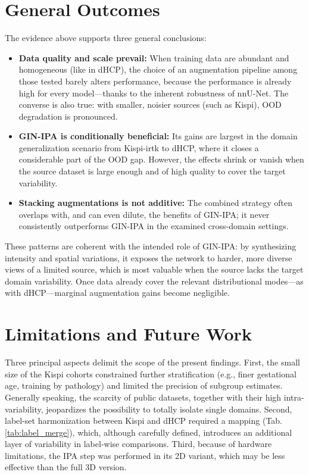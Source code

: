 \section{General Outcomes}
The evidence above supports three general conclusions:
\begin{itemize}
    \item \textbf{Data quality and scale prevail:} When training data are abundant and homogeneous (like in dHCP), the choice of an augmentation pipeline among those tested barely alters performance, because the performance is already high for every model---thanks to the inherent robustness of nnU-Net. The converse is also true: with smaller, noisier sources (such as Kispi), OOD degradation is pronounced.
    \item \textbf{GIN-IPA is conditionally beneficial:} Its gains are largest in the domain generalization scenario from Kispi-irtk to dHCP, where it closes a considerable part of the OOD gap. However, the effects shrink or vanish when the source dataset is large enough and of high quality to cover the target variability.
    \item \textbf{Stacking augmentations is not additive:} The combined strategy often overlaps with, and can even dilute, the benefits of GIN-IPA; it never consistently outperforms GIN-IPA in the examined cross-domain settings.
\end{itemize}

These patterns are coherent with the intended role of GIN-IPA: by synthesizing intensity and spatial variations, it exposes the network to harder, more diverse views of a limited source, which is most valuable when the source lacks the target domain variability. Once data already cover the relevant distributional modes---as with dHCP---marginal augmentation gains become negligible.

\section{Limitations and Future Work}
Three principal aspects delimit the scope of the present findings. First, the small size of the Kispi cohorts constrained further stratification (e.g., finer gestational age, training by pathology) and limited the precision of subgroup estimates. Generally speaking, the scarcity of public datasets, together with their high intra-variability, jeopardizes the possibility to totally isolate single domains. Second, label-set harmonization between Kispi and dHCP required a mapping (Tab.\,\ref{tab:label_merge}), which, although carefully defined, introduces an additional layer of variability in label-wise comparisons. Third, because of hardware limitations, the IPA step was performed in its 2D variant, which may be less effective than the full 3D version.

